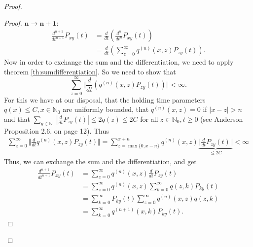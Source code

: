 \documentclass[12pt,a4paper]{scrartcl}
\numberwithin{equation}{section}
\newcommand{\N}{\mathbb{N}} %
\begin{document}
\begin{proof}
\begin{proof}
$\mathbf{n \rightarrow n+1}$:\\
\begin{align*}
\frac{d^{n+1}}{dt^{n+1}} P_{xy}\left(t\right) &= \frac{d}{dt} \left( \frac{d^n}{dt^n} P_{xy}\left(t\right) \right) \\
&= \frac{d}{dt} \left( \sum_{z=0}^{\infty} q^{\left(n\right)}\left(x,z\right) P_{zy}\left(t\right) \right).
\end{align*}
Now in order to exchange the sum and the differentiation, we need to apply theorem \ref{th:sumdifferentiation}. So we need to show that 
\begin{equation}
\sum_{z=0}^{\infty} \Vert \frac{d}{dt} \left(q^{\left(n\right)}\left(x,z\right) P_{zy}\left(t\right) \right) \Vert < \infty.
\end{equation}
For this we have at our disposal, that the holding time parameters $q\left(x\right) \leq C, x \in \N_0$ are uniformly bounded, that $q^{\left(n\right)} \left(x,z\right) = 0$ if $ \left|x-z\right| > n $ and that $\sum_{y \in \N_0} \left|\frac{d}{dt} P_{zy}\left(t\right) \right| \leq 2 q\left(z\right) \leq 2C $ for all $z \in \N_0, t\geq 0$ (see Anderson \cite{anderson} Proposition 2.6. on page 12). Thus
\begin{align*}
\sum_{z=0}^{\infty} \Vert \frac{d}{dt} q^{\left(n\right)}\left(x,z\right) P_{zy}\left(t\right) \Vert = \sum_{z= \max\lbrace 0, x-n \rbrace}^{x+n} q^{\left(n\right)}\left(x,z\right) \underset{\leq 2C}{\underbrace{\Vert \frac{d}{dt} P_{zy}\left(t\right) \Vert}} < \infty
\end{align*}
Thus, we can exchange the sum and the differentiation, and get
\begin{align*}
\frac{d^{n+1}}{dt^{n+1}} P_{xy}\left(t\right) &=  \sum_{z=0}^{\infty} q^{\left(n\right)}\left(x,z\right) \frac{d}{dt} P_{zy}\left(t\right) \\
&= \sum_{z=0}^{\infty} q^{\left(n\right)}\left(x,z\right) \sum_{k=0}^{\infty} q\left(z,k\right) P_{ky}\left(t\right) \\
&= \sum_{k=0}^{\infty} P_{ky}\left(t\right) \sum_{z=0}^{\infty} q^{\left(n\right)} \left(x,z\right) q\left(z,k\right)\\
&= \sum_{k=0}^{\infty} q^{\left(n+1\right)}\left(x,k\right) P_{ky}\left(t\right).
\end{align*}

\end{proof}


\end{proof}
\end{document}

